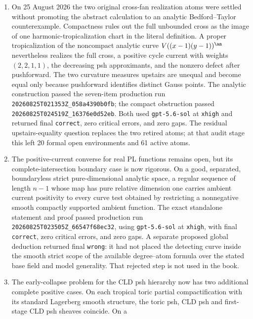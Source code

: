 \begin{enumerate}
  atom P20.1 were retired, leaving 20 formal open environments and 62 active
  atoms book-wide.  No novelty or priority claim is made.
\item On 25 August 2026 the two original cross-fan realization atoms were
  settled without promoting the abstract calculation to an analytic
  Bedford--Taylor counterexample.  Compactness rules out the full unbounded
  cross as the image of one harmonic-tropicalization chart in the literal
  definition.  A proper tropicalization of the noncompact analytic curve
  \(V((x-1)(y-1))^{\an}\) nevertheless realizes the full cross, a positive
  cycle current with weights \((2,2,1,1)\), the decreasing psh
  approximants, and the nonzero defect after pushforward.  The two curvature
  measures upstairs are unequal and become equal only because pushforward
  identifies distinct Gauss points.  The analytic construction passed the
  seven-item production run
  \texttt{20260825T021353Z\_058a4390b0fb}; the compact obstruction passed
  \texttt{20260825T024519Z\_16376e0d52eb}.  Both used
  \texttt{gpt-5.6-sol} at \texttt{xhigh} and returned final
  \texttt{correct}, zero critical errors, and zero gaps.  The residual
  upstairs-equality question replaces the two retired atoms; at that audit
  stage this left 20 formal open environments and 61 active atoms.
\item The positive-current converse for real PL functions remains open, but
  its complete-intersection boundary case is now rigorous.  On a good,
  separated, boundaryless strict pure-dimensional analytic space, a regular
  sequence of length \(n-1\) whose map has pure relative dimension one
  carries ambient current positivity to every curve test obtained by
  restricting a nonnegative smooth compactly supported ambient function.
  The exact standalone statement and proof passed production run
  \texttt{20260825T023505Z\_66547f68ec32}, using
  \texttt{gpt-5.6-sol} at \texttt{xhigh}, with final
  \texttt{correct}, zero critical errors, and zero gaps.  A separate proposed
  global deduction returned final \texttt{wrong}: it had not placed the
  detecting curve inside the smooth strict scope of the available
  degree--atom formula over the stated base field and model generality.  That
  rejected step is not used in the book.
\item The early-collapse problem for the CLD psh hierarchy now has two
  additional complete positive cases.  On each tropical toric partial
  compactification with its standard Lagerberg smooth structure, the toric
  psh, CLD psh and first-stage CLD psh sheaves coincide.  On a

\end{enumerate}
